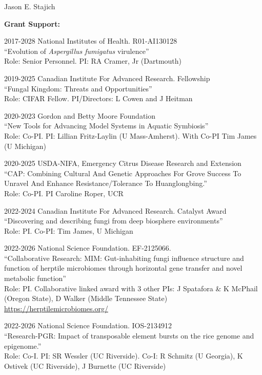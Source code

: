 \documentclass[10pt]{article}
\begin{document}
\begin{cv}{\centerline{Jason E. Stajich}}
\begin{cvlistcompact}{\bf Grant Support:}
\item [2017-2028] National Institutes of Health. R01-AI130128 \\
  ``Evolution of \textit{Aspergillus fumigatus} virulence'' \\
Role: Senior Personnel. PI: RA Cramer, Jr (Dartmouth)

\item [2019-2025] Canadian Institute For Advanced Research. Fellowship \\
  ``Fungal Kingdom: Threats and Opportunities'' \\
Role: CIFAR Fellow. PI/Directors: L Cowen and J Heitman

\item [2020-2023] Gordon and Betty Moore Foundation \\
  ``New Tools for Advancing Model Systems in Aquatic Symbiosis''  \\
Role: Co-PI. PI: Lillian Fritz-Laylin (U Mass-Amherst). With Co-PI Tim James (U Michigan)

\item [2020-2025] USDA-NIFA, Emergency Citrus Disease Research and Extension \\
``CAP: Combining Cultural And Genetic Approaches For Grove Success To Unravel And Enhance Resistance/Tolerance To Huanglongbing.'' \\
Role: Co-PI. PI Caroline Roper, UCR

\item [2022-2024] Canadian Institute For Advanced Research. Catalyst Award \\
  ``Discovering and describing fungi from deep biosphere environments'' \\
Role: PI. Co-PI: Tim James, U Michigan

\item [2022-2026] National Science Foundation. EF-2125066. \\
``Collaborative Research: MIM: Gut-inhabiting fungi influence structure and function of herptile microbiomes through horizontal gene transfer and novel metabolic function'' \\
  Role: PI. Collaborative linked award with 3 other PIs: J Spatafora \& K McPhail (Oregon State), D Walker (Middle Tennessee State)
\url{https://herptilemicrobiomes.org/}

\item [2022-2026] National Science Foundation. IOS-2134912 \\
  ``Research-PGR: Impact of transposable element bursts on the rice genome and epigenome.'' \\
Role: Co-I. PI: SR Wessler (UC Riverside). Co-I: R Schmitz (U Georgia), K Ostivek (UC Riverside), J Burnette (UC Riverside)


\end{cvlistcompact}
\end{cv}
\end{document}
